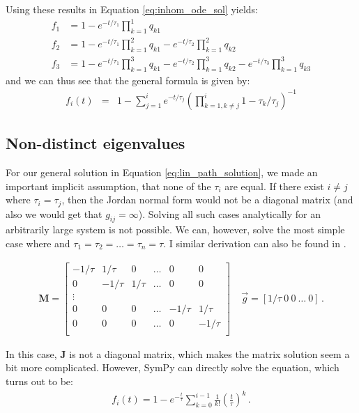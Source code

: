 \documentclass{article}
\begin{document}
Using these results in Equation \ref{eq:inhom_ode_sol} yields:
\begin{align*}
	f_1 &= 1 - e^{-t/\tau_1} \prod_{k=1}^1 q_{k1}\\
	f_2 &= 1 - e^{-t/\tau_1} \prod_{k=1}^2 q_{k1} - e^{-t/\tau_2} \prod_{k=1}^2 q_{k2}\\
	f_3 &= 1 - e^{-t/\tau_1} \prod_{k=1}^3 q_{k1} - e^{-t/\tau_2} \prod_{k=1}^3 q_{k2} - e^{-t/\tau_3} \prod_{k=1}^3 q_{k3}
\end{align*}
and we can thus see that the general formula is given by:
\begin{eqnarray}\label{eq:lin_path_solution}
f_i(t) &=& 1 - \sum_{j=1}^i e^{-t/\tau_j} \left(\prod_{k = 1, k \neq j}^i 1 - \tau_k/\tau_j\right)^{-1}
\end{eqnarray}

\subsection{Non-distinct eigenvalues}\label{sec:equal_taus}
For our general solution in Equation \ref{eq:lin_path_solution}, we made an important implicit assumption, that none of the $\tau_i$ are equal. If there exist $i \neq j$ where $\tau_i = \tau_j$, then the Jordan normal form would not be a diagonal matrix (and also we would get that $g_{ij} = \infty$). Solving all such cases analytically for an arbitrarily large system is not possible. We can, however, solve the most simple case where and $\tau_1 = \tau_2 = \ldots = \tau_n = \tau$. I similar derivation can also be found in \cite{sokol_theoretical_2015}.

\begin{eqnarray}
\mathbf{M} =
\begin{bmatrix}
-1/\tau & 1/\tau & 0 & \ldots & 0 & 0\\
0 & -1/\tau & 1/\tau & \ldots & 0 & 0\\
\vdots\\
0 & 0 & 0 & \ldots & -1/\tau & 1/\tau\\
0 & 0 & 0 & \ldots & 0 & -1/\tau \\
\end{bmatrix}
~~~~~
\vec{g} = \left[1/\tau~0~0~\ldots~0\right]\,.
\end{eqnarray}

In this case, $\mathbf{J}$ is not a diagonal matrix, which makes the matrix solution seem a bit more complicated. However, SymPy can directly solve the equation, which turns out to be:
\begin{eqnarray}\label{eq:equal_tau_solution}
    f_i(t) = 1 - e^{-\frac{t}{\tau}}\sum_{k=0}^{i-1} \frac{1}{k!}\left(\frac{t}{\tau}\right)^k\,.
\end{eqnarray}
\end{document}
